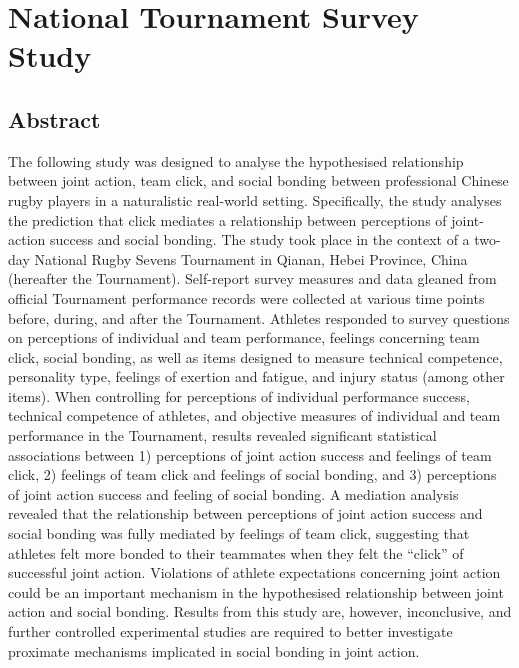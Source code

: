 \chapter{\label{chap:tournamentSurvey}National Tournament Survey Study}
                                            \begin{CJK}{UTF8}{gbsn}

\minitoc
\section{Abstract}

The following study was designed to analyse the hypothesised relationship between joint action, team click, and social bonding between professional Chinese rugby players in a naturalistic real-world setting.  Specifically, the study analyses the prediction that click mediates a relationship between perceptions of joint-action success and social bonding.  The study took place in the context of a two-day National Rugby Sevens Tournament in Qianan, Hebei Province, China (hereafter the Tournament).  Self-report survey measures and data gleaned from official Tournament performance records were collected at various time points before, during, and after the Tournament.  Athletes responded to survey questions on perceptions of individual and team performance, feelings concerning team click, social bonding, as well as items designed to measure technical competence, personality type, feelings of exertion and fatigue, and injury status (among other items). When controlling for perceptions of individual performance success, technical competence of athletes, and objective measures of individual and team performance in the Tournament, results revealed significant statistical associations between 1) perceptions of joint action success and feelings of team click, 2) feelings of team click and feelings of social bonding, and 3) perceptions of joint action success and feeling of social bonding.  A mediation analysis revealed that the relationship between perceptions of joint action success and social bonding was fully mediated by feelings of team click, suggesting that athletes felt more bonded to their teammates when they felt the ``click'' of successful joint action.  Violations of athlete expectations concerning joint action could be an important mechanism in the hypothesised relationship between joint action and social bonding. Results from this study are, however, inconclusive, and further controlled experimental studies are required to better investigate proximate mechanisms implicated in social bonding in joint action.


\end{CJK}
